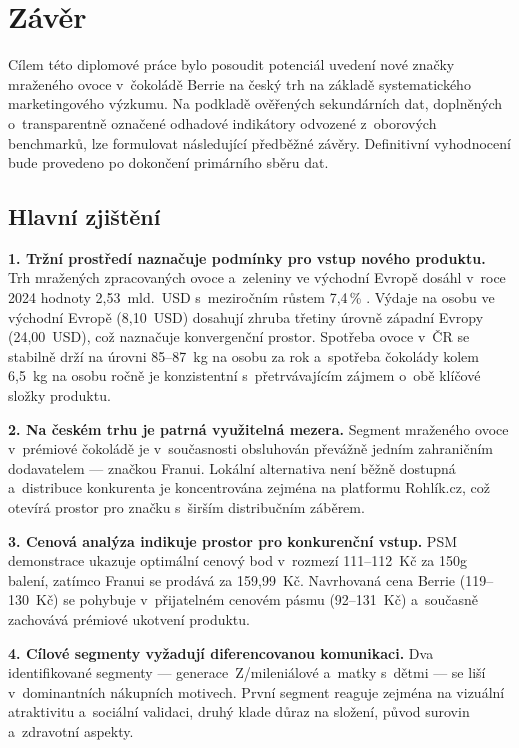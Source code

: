 \chapter{Závěr}
\label{chap:conclusion}

Cílem této diplomové práce bylo posoudit potenciál uvedení nové značky mraženého ovoce v~čokoládě Berrie na český trh na základě systematického marketingového výzkumu. Na podkladě ověřených sekundárních dat, doplněných o~transparentně označené odhadové indikátory odvozené z~oborových benchmarků, lze formulovat následující předběžné závěry. Definitivní vyhodnocení bude provedeno po dokončení primárního sběru dat.

\section{Hlavní zjištění}

\textbf{1. Tržní prostředí naznačuje podmínky pro vstup nového produktu.} Trh mražených zpracovaných ovoce a~zeleniny ve východní Evropě dosáhl v~roce 2024 hodnoty 2,53~mld.~USD s~meziročním růstem 7,4\,\% \parencite{frozenfoodeurope_2025}. Výdaje na osobu ve východní Evropě (8,10~USD) dosahují zhruba třetiny úrovně západní Evropy (24,00~USD), což naznačuje konvergenční prostor. Spotřeba ovoce v~ČR se stabilně drží na úrovni 85--87~kg na osobu za rok \parencite{czso_spotreba_2024} a~spotřeba čokolády kolem 6,5~kg na osobu ročně je konzistentní s~přetrvávajícím zájmem o~obě klíčové složky produktu.

\textbf{2. Na českém trhu je patrná využitelná mezera.} Segment mraženého ovoce v~prémiové čokoládě je v~současnosti obsluhován převážně jedním zahraničním dodavatelem — značkou Franui. Lokální alternativa není běžně dostupná a~distribuce konkurenta je koncentrována zejména na platformu Rohlík.cz, což otevírá prostor pro značku s~širším distribučním záběrem.

\textbf{3. Cenová analýza indikuje prostor pro konkurenční vstup.} PSM demonstrace ukazuje optimální cenový bod v~rozmezí 111--112~Kč za 150g balení, zatímco Franui se prodává za 159,99~Kč. Navrhovaná cena Berrie (119--130~Kč) se pohybuje v~přijatelném cenovém pásmu (92--131~Kč) a~současně zachovává prémiové ukotvení produktu.

\textbf{4. Cílové segmenty vyžadují diferencovanou komunikaci.} Dva identifikované segmenty — generace~Z/mileniálové a~matky s~dětmi — se liší v~dominantních nákupních motivech. První segment reaguje zejména na vizuální atraktivitu a~sociální validaci, druhý klade důraz na složení, původ surovin a~zdravotní aspekty.

